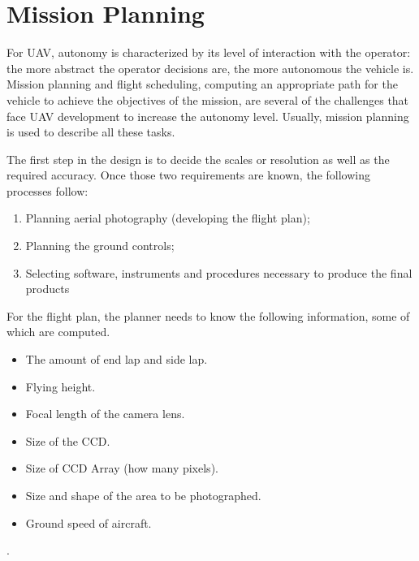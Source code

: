 \section{Mission Planning}
For UAV, autonomy is characterized by its level of interaction with the operator: the more abstract the operator decisions are, the more autonomous the vehicle is. Mission planning and flight scheduling, computing an appropriate path for the vehicle to achieve the objectives of the mission, are several of the challenges that face UAV development to increase the autonomy level. Usually, mission planning is used to describe all these tasks.\cite{4281723}

The first step in the design is to decide the scales or resolution as well as the required accuracy. Once those two requirements are known, the following processes follow:
\begin{enumerate}
\item Planning aerial photography (developing the flight plan);
\item Planning the ground controls;
\item Selecting software, instruments and procedures necessary to produce the final products
\end{enumerate}
For the flight plan, the planner needs to know the following information, some of which are computed.\cite{Design_plann}
\begin{itemize}
\item The amount of end lap and side lap.
\item Flying height.
\item Focal length of the camera lens.
\item Size of the CCD.
\item Size of CCD Array (how many pixels).
\item Size and shape of the area to be photographed.
\item Ground speed of aircraft.
\end{itemize}.


